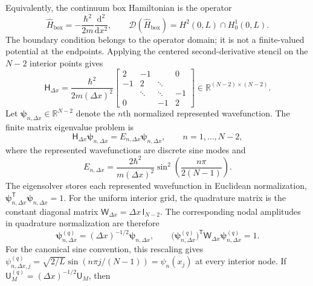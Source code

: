\documentclass[11pt]{article}
\newcommand{\RR}{\mathbb{R}}
\newcommand{\mat}[1]{\mathsf{#1}}
\newcommand{\vect}[1]{\boldsymbol{#1}}
\begin{document}
Equivalently, the continuum box Hamiltonian is the operator
\begin{equation}
 \widehat H_{\mathrm{box}}
 =-\frac{\hbar^2}{2m}\frac{\mathrm{d}^2}{\mathrm{d}x^2},
 \qquad
 \mathcal D(\widehat H_{\mathrm{box}})=H^2(0,L)\cap H_0^1(0,L).
 \label{eq:continuum-operator}
\end{equation}
The boundary condition belongs to the operator domain; it is not a finite-valued
potential at the endpoints. Applying the centered second-derivative stencil on the
$N-2$ interior points gives
\begin{equation}
 \mat{H}_{\Delta x}=\frac{\hbar^2}{2m(\Delta x)^2}
 \begin{bmatrix}
 2&-1&&0\\
 -1&2&\ddots&\\
 &\ddots&\ddots&-1\\
 0&&-1&2
 \end{bmatrix}
 \in\RR^{(N-2)\times(N-2)}.
 \label{eq:finite-hamiltonian}
\end{equation}
Let $\vect{\psi}_{n,\Delta x}\in\RR^{N-2}$ denote the $n$th normalized represented
wavefunction. The finite matrix eigenvalue problem is
\begin{equation}
 \mat{H}_{\Delta x}\vect{\psi}_{n,\Delta x}
 =E_{n,\Delta x}\vect{\psi}_{n,\Delta x},
 \qquad n=1,\ldots,N-2,
 \label{eq:discrete-eigenproblem}
\end{equation}
where the represented wavefunctions are discrete sine modes and
\begin{equation}
 E_{n,\Delta x}
 =\frac{2\hbar^2}{m(\Delta x)^2}
 \sin^2\!\left(\frac{n\pi}{2(N-1)}\right).
 \label{eq:discrete-spectrum}
\end{equation}
The eigensolver stores each represented wavefunction in Euclidean normalization,
$\vect{\psi}_{n,\Delta x}^{\mathsf T}\vect{\psi}_{n,\Delta x}=1$. For the uniform
interior grid, the quadrature matrix is the constant diagonal matrix
$\mat{W}_{\Delta x}=\Delta x\,\mat{I}_{N-2}$. The corresponding nodal amplitudes in
quadrature normalization are therefore
\begin{equation}
 \vect{\psi}^{(q)}_{n,\Delta x}
 =(\Delta x)^{-1/2}\vect{\psi}_{n,\Delta x},
 \qquad
 \bigl(\vect{\psi}^{(q)}_{n,\Delta x}\bigr)^{\mathsf T}
 \mat{W}_{\Delta x}\vect{\psi}^{(q)}_{n,\Delta x}=1.
 \label{eq:quadrature-normalization}
\end{equation}
For the canonical sine convention, this rescaling gives
$\psi^{(q)}_{n,\Delta x,j}=\sqrt{2/L}\sin(n\pi j/(N-1))=\psi_n(x_j)$ at every
interior node. If $\mat{U}^{(q)}_M=(\Delta x)^{-1/2}\mat{U}_M$, then
\end{document}
